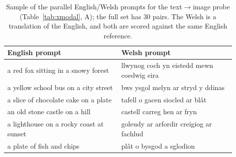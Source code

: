 \begin{table}[h]\centering\footnotesize
\setlength{\tabcolsep}{6pt}
\begin{tabular}{@{}p{0.46\linewidth}p{0.46\linewidth}@{}}
\toprule
\textbf{English prompt} & \textbf{Welsh prompt} \\
\midrule
a red fox sitting in a snowy forest & llwynog coch yn eistedd mewn coedwig eira \\
a yellow school bus on a city street & bws ysgol melyn ar stryd y ddinas \\
a slice of chocolate cake on a plate & tafell o gacen siocled ar bl\^at \\
an old stone castle on a hill & castell carreg hen ar fryn \\
a lighthouse on a rocky coast at sunset & goleudy ar arfordir creigiog ar fachlud \\
a plate of fish and chips & pl\^at o bysgod a sglodion \\
\bottomrule
\end{tabular}
\caption{Sample of the parallel English/Welsh prompts for the text$\to$image
probe (Table~\ref{tab:xmodal}, A); the full set has $30$ pairs. The Welsh is
a translation of the English, and both are scored against the same English
reference.}
\label{tab:xmodal-welsh-prompts}
\end{table}

